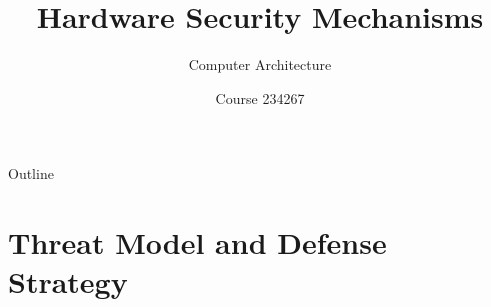 \documentclass[aspectratio=169,12pt]{beamer}
\title{Hardware Security Mechanisms}
\subtitle{Computer Architecture}
\author{Course 234267}
\date{}
\begin{document}
\frame{\titlepage}




\begin{frame}{Outline}
    \tableofcontents
\end{frame}


\section{Threat Model and Defense Strategy}
\end{document}
